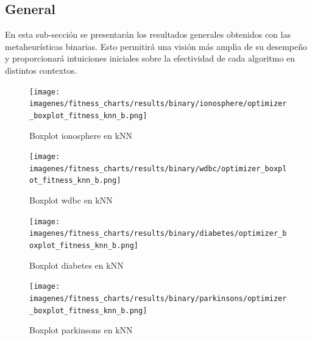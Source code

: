 \subsection{General}
En esta sub-sección se presentarán los resultados generales obtenidos con las metaheurísticas binarias. Esto permitirá una visión más amplia de su desempeño y proporcionará intuiciones iniciales sobre la efectividad de cada algoritmo en distintos contextos.

\begin{figure}[htb]
    \centering
    \texttt{[image: imagenes/fitness\_charts/results/binary/ionosphere/optimizer\_boxplot\_fitness\_knn\_b.png]}
    \caption{Boxplot ionosphere en kNN}
    \label{fig:boxplot_ionosphere}
\end{figure}

\begin{figure}[htb]
    \centering
    \texttt{[image: imagenes/fitness\_charts/results/binary/wdbc/optimizer\_boxplot\_fitness\_knn\_b.png]}
    \caption{Boxplot wdbc en kNN}
    \label{fig:boxplot_wdbc}
\end{figure}

\begin{figure}[htb]
    \centering
    \texttt{[image: imagenes/fitness\_charts/results/binary/diabetes/optimizer\_boxplot\_fitness\_knn\_b.png]}
    \caption{Boxplot diabetes en kNN}
    \label{fig:boxplot_diabetes}
\end{figure}

\begin{figure}[htb]
    \centering
    \texttt{[image: imagenes/fitness\_charts/results/binary/parkinsons/optimizer\_boxplot\_fitness\_knn\_b.png]}
    \caption{Boxplot parkinsons en kNN}
    \label{fig:boxplot_parkinsons}
\end{figure}

